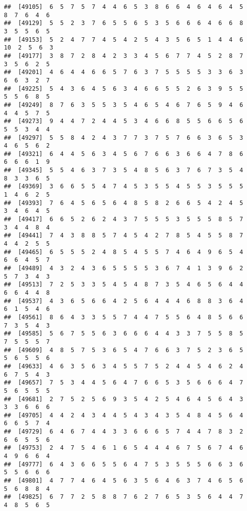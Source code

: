 \documentclass[
]{book}
\begin{document}
\begin{verbatim}
##  [49105]  6  5  7  5  7  4  4  6  5  3  8  6  6  4  6  4  6  4  5  8  7  6  4  6
##  [49129]  5  5  2  3  7  6  5  5  6  5  3  5  6  6  6  4  6  6  8  3  5  5  6  5
##  [49153]  5  2  4  7  7  4  5  4  2  5  4  3  5  6  5  1  4  4  6 10  2  5  6  3
##  [49177]  3  8  7  2  8  4  2  3  3  4  5  6  7  7  4  5  2  8  7  3  5  6  2  5
##  [49201]  4  6  4  4  6  6  5  7  6  3  7  5  5  5  5  3  3  6  3  6  6  3  2  7
##  [49225]  5  4  3  6  4  5  6  3  4  6  6  5  5  2  6  3  9  5  5  5  5  6  8  5
##  [49249]  8  7  6  3  5  5  3  5  4  6  5  4  6  7  6  5  9  4  6  4  4  5  7  5
##  [49273]  9  4  4  7  2  4  4  5  3  4  6  6  8  5  5  6  6  5  6  5  5  3  4  4
##  [49297]  5  5  8  4  2  4  3  7  7  3  7  5  7  6  6  3  6  5  3  4  6  5  6  2
##  [49321]  6  4  4  5  6  3  4  5  6  7  6  6  3  6  6  4  7  8  6  6  6  6  1  9
##  [49345]  5  5  4  6  3  7  3  5  4  8  5  6  3  7  6  7  3  5  4  8  3  3  6  5
##  [49369]  3  6  6  5  5  4  7  4  5  3  5  5  4  5  5  3  5  5  5  1  4  6  2  5
##  [49393]  7  6  4  5  6  5  6  4  8  5  8  2  6  6  5  4  2  4  5  3  4  6  4  5
##  [49417]  6  6  5  2  6  2  4  3  7  5  5  5  3  5  5  5  8  5  7  3  4  4  8  4
##  [49441]  7  4  3  8  8  5  7  4  5  4  2  7  8  5  4  5  5  8  7  4  4  2  5  5
##  [49465]  6  5  5  5  2  4  8  5  4  5  5  7  4  6  4  9  6  5  4  6  6  4  5  7
##  [49489]  4  3  2  4  3  6  5  5  5  5  3  6  7  4  1  3  9  6  2  5  7  3  4  3
##  [49513]  7  2  5  3  3  5  4  5  4  8  7  3  5  4  6  5  6  4  4  6  6  4  4  8
##  [49537]  4  3  6  5  6  6  4  2  5  6  4  4  4  6  8  8  3  6  4  6  1  5  4  6
##  [49561]  8  6  4  3  3  5  5  7  4  4  7  5  5  6  4  8  5  6  6  7  3  5  4  3
##  [49585]  5  6  7  5  5  6  3  6  6  6  4  4  3  3  7  5  5  8  5  7  5  5  5  7
##  [49609]  4  8  5  7  5  3  6  5  4  7  6  6  3  7  5  2  3  6  5  5  6  5  5  6
##  [49633]  4  6  3  5  6  3  4  5  5  7  5  2  4  4  5  4  6  2  4  6  7  5  4  3
##  [49657]  7  5  3  4  4  5  6  4  7  6  6  5  3  5  6  6  6  4  7  5  6  5  5  5
##  [49681]  2  7  5  2  5  6  9  3  5  4  2  5  4  6  4  5  6  4  3  3  3  6  6  6
##  [49705]  4  4  2  4  3  4  4  5  4  3  4  3  5  4  8  4  5  6  4  6  6  5  7  4
##  [49729]  6  4  6  7  4  4  3  3  6  6  6  5  7  4  4  7  8  3  2  6  6  5  5  6
##  [49753]  2  4  7  5  4  6  1  6  5  4  4  4  6  7  5  6  7  4  6  4  9  6  6  4
##  [49777]  6  4  3  6  6  5  5  6  4  7  5  3  5  5  5  6  6  3  6  5  5  6  6  6
##  [49801]  4  7  7  4  6  4  5  6  3  5  6  4  6  3  7  4  6  5  6  5  6  8  8  4
##  [49825]  6  7  7  2  5  8  8  7  6  2  7  6  5  3  5  6  4  4  7  4  8  5  6  5

\end{verbatim}
\end{document}
